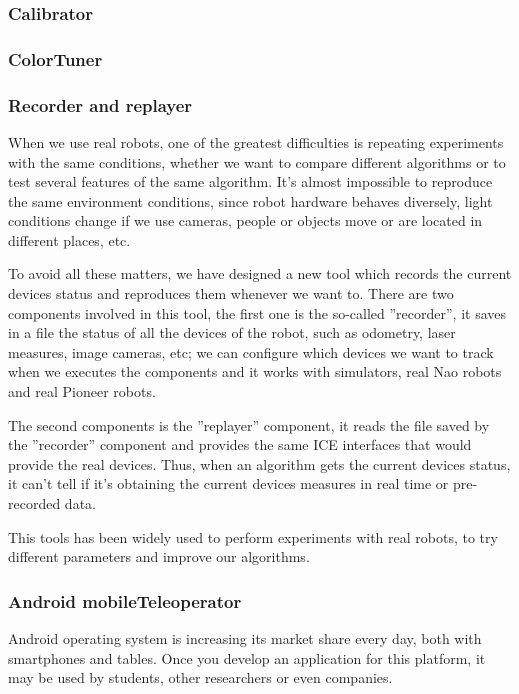 \documentclass[twocolumn]{svjour3}          %
\begin{document}
\subsubsection{Calibrator}
\subsubsection{ColorTuner}
\subsubsection{Recorder and replayer}

When we use real robots, one of the greatest difficulties is repeating experiments with the same conditions, whether we want to compare different algorithms or to test several features of the same algorithm. It's almost impossible to reproduce the same environment conditions, since robot hardware behaves diversely, light conditions change if we use cameras, people or objects move or are located in different places, etc.

To avoid all these matters, we have designed a new tool which records the current devices status and reproduces them whenever we want to. There are two components involved in this tool, the first one is the so-called ''recorder'', it saves in a file the status of all the devices of the robot, such as odometry, laser measures, image cameras, etc; we can configure which devices we want to track when we executes the components and it works with simulators, real Nao robots and real Pioneer robots.

The second components is the ''replayer'' component, it reads the file saved by the ''recorder'' component and provides the same ICE interfaces that would provide the real devices. Thus, when an algorithm gets the current devices status, it can't tell if it's obtaining the current devices measures in real time or pre-recorded data.

This tools has been widely used to perform experiments with real robots, to try different parameters and improve our algorithms.

\subsubsection{Android mobileTeleoperator}

Android operating system is increasing its market share every day, both with smartphones and tables. Once you develop an application for this platform, it may be used by students, other researchers or even companies. 
\end{document}
